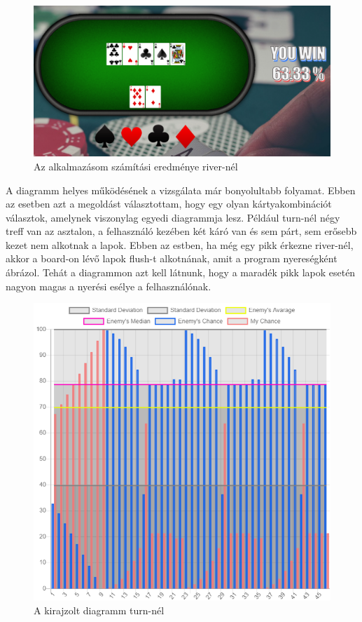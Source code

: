 \begin{figure}[ht]
\centering
\includegraphics[scale=0.47]{images/test-my.png}
\caption{Az alkalmazásom számítási eredménye river-nél}
\label{fig:test-my}
\end{figure}

A diagramm helyes működésének a vizsgálata már bonyolultabb folyamat. Ebben az esetben azt a megoldást választottam, hogy egy olyan kártyakombinációt választok, amelynek viszonylag egyedi diagrammja lesz. Például turn-nél négy treff van az asztalon, a felhasználó kezében két káró van és sem párt, sem erősebb kezet nem alkotnak a lapok. Ebben az estben, ha még egy pikk érkezne river-nél, akkor a board-on lévő lapok flush-t alkotnának, amit a program nyereségként ábrázol. Tehát a diagrammon azt kell látnunk, hogy a maradék pikk lapok esetén nagyon magas a nyerési esélye a felhasználónak.

\begin{figure}[ht] 
\centering
\includegraphics[scale=0.9]{images/chart-test.png}
\caption{A kirajzolt diagramm turn-nél}
\label{fig:chart-test}
\end{figure}

